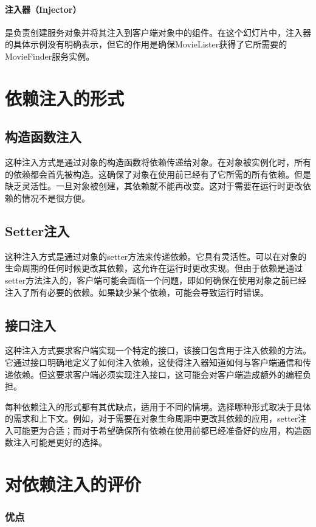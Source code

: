 \paragraph{注入器（Injector）}是负责创建服务对象并将其注入到客户端对象中的组件。在这个幻灯片中，注入器的具体示例没有明确表示，但它的作用是确保MovieLister获得了它所需要的MovieFinder服务实例。

\section{依赖注入的形式}

\subsection{构造函数注入}
这种注入方式是通过对象的构造函数将依赖传递给对象。在对象被实例化时，所有的依赖都会首先被构造。这确保了对象在使用前已经有了它所需的所有依赖。但是缺乏灵活性。一旦对象被创建，其依赖就不能再改变。这对于需要在运行时更改依赖的情况不是很方便。
\subsection{Setter注入}
这种注入方式是通过对象的setter方法来传递依赖。它具有灵活性。可以在对象的生命周期的任何时候更改其依赖，这允许在运行时更改实现。但由于依赖是通过setter方法注入的，客户端可能会面临一个问题，即如何确保在使用对象之前已经注入了所有必要的依赖。如果缺少某个依赖，可能会导致运行时错误。
\subsection{接口注入}
这种注入方式要求客户端实现一个特定的接口，该接口包含用于注入依赖的方法。它通过接口明确地定义了如何注入依赖，这使得注入器知道如何与客户端通信和传递依赖。但这要求客户端必须实现注入接口，这可能会对客户端造成额外的编程负担。

每种依赖注入的形式都有其优缺点，适用于不同的情境。选择哪种形式取决于具体的需求和上下文。例如，对于需要在对象生命周期中更改其依赖的应用，setter注入可能更为合适；而对于希望确保所有依赖在使用前都已经准备好的应用，构造函数注入可能是更好的选择。

\section{对依赖注入的评价}

\subsubsection{优点}
